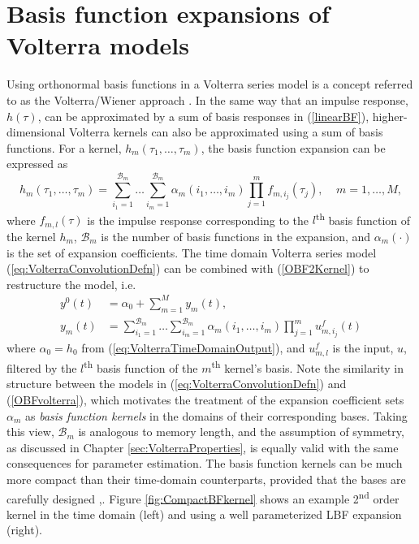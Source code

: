 \section{Basis function expansions of Volterra models}

Using orthonormal basis functions in a Volterra series model is a concept referred to as the Volterra/Wiener approach \cite{Rugh1980}. In the same way that an impulse response, $h(\tau)$, can be approximated by a sum of basis responses in (\ref{linearBF}), higher-dimensional Volterra kernels can also be approximated using a sum of basis functions.  For a kernel, $h_m(\tau_1,\hdots,\tau_m)$, the basis function expansion can be expressed as
\begin{equation}
\label{OBF2Kernel}
h_m(\tau_1,\hdots,\tau_m) = \sum_{i_1=1}^{\mathcal{B}_m} \hdots \sum_{i_m=1}^{\mathcal{B}_m} \alpha_m(i_1,\hdots,i_m) \prod_{j=1}^{m} f_{m,i_j}(\tau_j), \; \; \; \; m = 1, \hdots, M,
\end{equation}
where $f_{m,l}(\tau)$ is the impulse response corresponding to the $l$\textsuperscript{th} basis function of the kernel $h_m$, $\mathcal{B}_m$ is the number of basis functions in the expansion, and $\alpha_m(\cdot)$ is the set of expansion coefficients. The time domain Volterra series model (\ref{eq:VolterraConvolutionDefn}) can be combined with (\ref{OBF2Kernel}) to restructure the model, i.e.
\begin{equation}
\begin{split}
\label{OBFvolterra}
y^0(t) &= \alpha_0 + \sum_{m=1}^{M} y_m(t), \\
y_m(t) &= \sum_{i_1=1}^{\mathcal{B}_m} \hdots \sum_{i_m=1}^{\mathcal{B}_m} \alpha_m(i_1,\hdots,i_m) \prod_{j=1}^{m} u^f_{m,i_j}(t)
\end{split}
\end{equation}
where $\alpha_0 = h_0$ from (\ref{eq:VolterraTimeDomainOutput}), and $u^f_{m,l}$ is the input, $u$, filtered by the $l$\textsuperscript{th} basis function of the $m$\textsuperscript{th} kernel's basis. Note the similarity in structure between the models in (\ref{eq:VolterraConvolutionDefn}) and (\ref{OBFvolterra}), which motivates the treatment of the expansion coefficient sets $\alpha_m$ as \emph{basis function kernels} in the domains of their corresponding bases. Taking this view, $\mathcal{B}_m$ is analogous to memory length, and the assumption of symmetry, as discussed in Chapter \ref{sec:VolterraProperties}, is equally valid with the same consequences for parameter estimation. The basis function kernels can be much more compact than their time-domain counterparts, provided that the bases are carefully designed \cite{Campello2004},\cite{Rosa2007}. Figure \ref{fig:CompactBFkernel} shows an example 2\textsuperscript{nd} order kernel in the time domain (left) and using a well parameterized LBF expansion (right).

